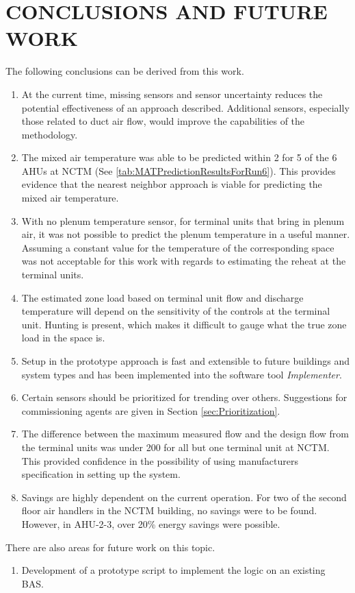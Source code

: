 \chapter{\texorpdfstring{\MakeUppercase{Conclusions and Future Work}}{Conclusions and Future Work}} 

The following conclusions can be derived from this work.

\begin{enumerate}
    \item At the current time, missing sensors and sensor uncertainty 
        reduces the potential effectiveness of an approach described. 
        Additional sensors, especially those related to duct air flow,
        would improve the capabilities of the methodology. 
    \item The mixed air temperature was able to be predicted within
        \SI{2}{\degF} for 5 of the 6 AHUs at NCTM (See \tableref{}
        \ref{tab:MATPredictionResultsForRun6}). This provides evidence
        that the nearest neighbor approach is viable for predicting the
        mixed air temperature. 
    \item With no plenum temperature sensor, for terminal units that
        bring in plenum air, it was not possible to predict the plenum
        temperature in a useful manner. Assuming a constant value for the
        temperature of the corresponding space was not acceptable for
        this work with regards to estimating the reheat at the terminal units.
    \item The estimated zone load based on terminal unit flow and
        discharge temperature will depend on the sensitivity of the
        controls at the terminal unit. Hunting is present, which makes
        it difficult to gauge what the true zone load in the space is. 
    \item Setup in the prototype approach is fast and extensible to
        future buildings and system types and has been implemented into
        the software tool \textit{Implementer}. 
    \item Certain sensors should be prioritized for trending over
        others. Suggestions for commissioning agents are given in
        Section \ref{sec:Prioritization}. 
    \item The difference between the maximum measured flow and the design flow
        from the terminal units was under \SI{200}{\CFM} for all but one
        terminal unit at NCTM. This provided confidence in the
        possibility of using manufacturers specification in setting up
        the system. 
    \item Savings are highly dependent on the current operation. For two
        of the second floor air handlers in the NCTM building, no
        savings were to be found. However, in AHU-2-3, over 20\% energy
        savings were possible. 
\end{enumerate}

There are also areas for future work on this topic.

\begin{enumerate}
    \item Development of a prototype script to implement the logic on an
        existing BAS. 

\end{enumerate}

